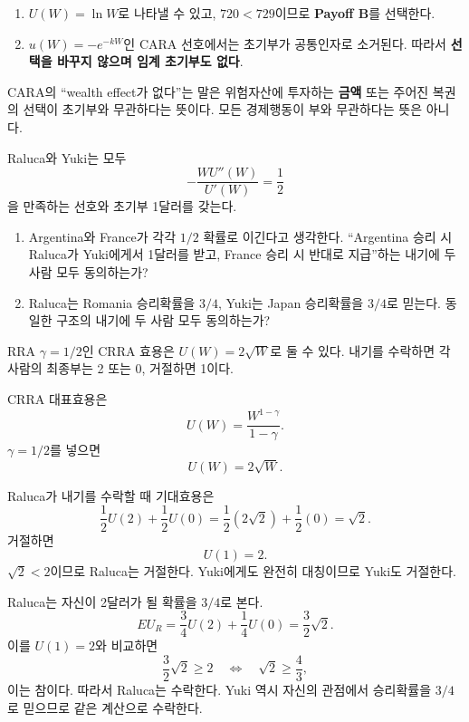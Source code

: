 \begin{answerbox}
\begin{enumerate}[label=(\alph*)]
\item $U(W)=\ln W$로 나타낼 수 있고, $720<729$이므로 \textbf{Payoff B}를 선택한다.
\item $u(W)=-e^{-kW}$인 CARA 선호에서는 초기부가 공통인자로 소거된다. 따라서 \textbf{선택을 바꾸지 않으며 임계 초기부도 없다}.
\end{enumerate}
\end{answerbox}

\begin{warningbox}
CARA의 ``wealth effect가 없다''는 말은 위험자산에 투자하는 \textbf{금액} 또는 주어진 복권의 선택이 초기부와 무관하다는 뜻이다. 모든 경제행동이 부와 무관하다는 뜻은 아니다.
\end{warningbox}

\begin{officialbox}
Raluca와 Yuki는 모두
\[
-\frac{WU''(W)}{U'(W)}=\frac12
\]
을 만족하는 선호와 초기부 1달러를 갖는다.
\begin{enumerate}[label=(\alph*)]
\item Argentina와 France가 각각 $1/2$ 확률로 이긴다고 생각한다. ``Argentina 승리 시 Raluca가 Yuki에게서 1달러를 받고, France 승리 시 반대로 지급''하는 내기에 두 사람 모두 동의하는가?
\item Raluca는 Romania 승리확률을 $3/4$, Yuki는 Japan 승리확률을 $3/4$로 믿는다. 동일한 구조의 내기에 두 사람 모두 동의하는가?
\end{enumerate}
\end{officialbox}

\begin{strategybox}
RRA $\gamma=1/2$인 CRRA 효용은 $U(W)=2\sqrt W$로 둘 수 있다. 내기를 수락하면 각 사람의 최종부는 2 또는 0, 거절하면 1이다.
\end{strategybox}

\begin{solutionbox}
CRRA 대표효용은
\[
U(W)=\frac{W^{1-\gamma}}{1-\gamma}.
\]
$\gamma=1/2$를 넣으면
\[
U(W)=2\sqrt W.
\]

Raluca가 내기를 수락할 때 기대효용은
\[
\frac12U(2)+\frac12U(0)
=\frac12(2\sqrt2)+\frac12(0)=\sqrt2.
\]
거절하면
\[
U(1)=2.
\]
$\sqrt2<2$이므로 Raluca는 거절한다. Yuki에게도 완전히 대칭이므로 Yuki도 거절한다.

Raluca는 자신이 2달러가 될 확률을 $3/4$로 본다.
\[
EU_R=\frac34U(2)+\frac14U(0)=\frac32\sqrt2.
\]
이를 $U(1)=2$와 비교하면
\[
\frac32\sqrt2\ge2
\quad\Longleftrightarrow\quad
\sqrt2\ge\frac43,
\]
이는 참이다. 따라서 Raluca는 수락한다. Yuki 역시 자신의 관점에서 승리확률을 $3/4$로 믿으므로 같은 계산으로 수락한다.
\end{solutionbox}

